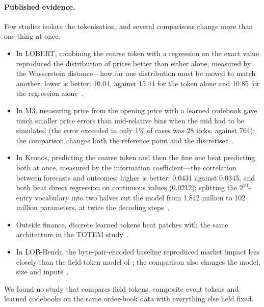 \paragraph{Published evidence.} Few studies isolate the tokenisation, and several comparisons change
more than one thing at once.
\begin{itemize}[leftmargin=1.5em,itemsep=1pt]
\item In LOBERT, combining the coarse token with a regression on the exact value reproduced the
  distribution of prices better than either alone, measured by the Wasserstein distance---how far one distribution
  must be moved to match another; lower is better: 10.04, against 15.44 for the token alone and 10.85 for the
  regression alone~\citep{linna2025lobert}.
\item In M3, measuring price from the opening price with a learned codebook gave much smaller price errors
  than mid-relative bins when the mid had to be simulated (the error exceeded in only 1\% of cases was 28 ticks,
  against 764); the
  comparison changes both the reference point and the discretiser~\citep{m3lob}.
\item In Kronos, predicting the coarse token and then the fine one beat predicting both at once, measured by the
  information coefficient---the correlation between forecasts and outcomes; higher is better: 0.0431 against
  0.0345, and both beat direct regression on continuous values
  (0.0212); splitting the $2^{20}$-entry vocabulary into two halves cut the model from 1{,}842 million to
  102 million parameters, at twice the decoding steps~\citep{kronos2025}.
\item Outside finance, discrete learned tokens beat patches with the same architecture in the TOTEM
  study~\citep{talukder2024totem}.
\item In LOB-Bench, the byte-pair-encoded baseline reproduced market impact less closely than the field-token
  model of \citet{nagy2023}; the comparison also changes the model, size and inputs~\citep{lobbench2025}.
\end{itemize}
We found no study that compares field tokens, composite event tokens and learned codebooks on the same
order-book data with everything else held fixed.

